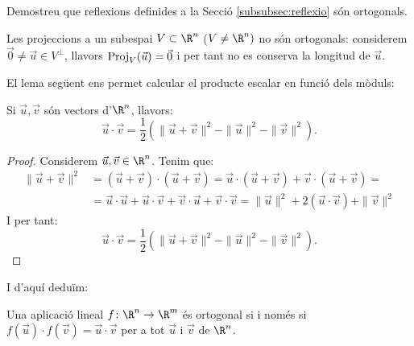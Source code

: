 \begin{exercici}
Demostreu que reflexions definides a la Secció \ref{subsubsec:reflexio} són ortogonals.
\end{exercici}
\begin{exemple}
Les projeccions a un subespai $V\subset \R^n$ ($V\neq \R^n)$ no són ortogonals: considerem $\vec 0 \neq \vec u \in V^\perp$, llavors $\operatorname{Proj}_V(\vec u)=\vec 0$ i per tant no es conserva la longitud de $\vec u$.
\end{exemple}

El lema següent ens permet calcular el producte escalar en funció dels mòduls:
\begin{lema}\label{lema:prod_esc_modul}
Si $\vec u, \vec v$ són vectors d'$\R^n$, llavors:
\[
\vec u \cdot \vec v = \frac{1}{2}\left(\|\vec u + \vec v\|^2 - \|\vec u\|^2 - \|\vec v\|^2\right).
\]
\end{lema}
\begin{proof}
Considerem $\vec u, \vec v \in \R^n$. Tenim que:
\begin{align*}
\|\vec u + \vec v\|^2 & =(\vec u+\vec v)\cdot(\vec u+\vec v) = \vec u \cdot (\vec u+ \vec v) + \vec v \cdot (\vec u+ \vec v) = \\
 & = \vec u \cdot \vec u  + \vec u \cdot \vec v + \vec v \cdot \vec u+\vec v \cdot \vec v = \|\vec u\|^2+2 (\vec u \cdot \vec v) + \|\vec v\|^2
\end{align*}
I per tant:
\[
\vec u \cdot \vec v = \frac{1}{2}\left(\|\vec u + \vec v\|^2 - \|\vec u\|^2 - \|\vec v\|^2\right).
\]
\end{proof}
I d'aquí deduïm:
\begin{teorema}
Una aplicació lineal $f\colon \R^n \to \R^m$ és ortogonal si i només si $f(\vec u)\cdot f(\vec v)=\vec u \cdot \vec v$ per a tot $\vec u$ i $\vec v$ de $\R^n$.
\end{teorema}
